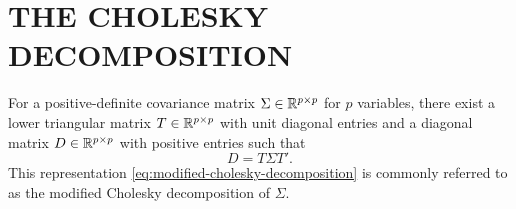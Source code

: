\documentclass[12pt]{article}
\newcommand{\red}[1]{{\color{red}\sout{#1}}}
\begin{document}
\section*{\sffamily \Large THE CHOLESKY DECOMPOSITION}

For a positive-definite covariance matrix $\Sigma \in \Bbb{R}^{p\times p}$ for $p$ variables, there exist a  lower triangular matrix $T \in \Bbb{R}^{p\times p}$ with unit diagonal entries and a diagonal matrix $D \in \Bbb{R}^{p\times p}$ with positive entries such that
\begin{equation}\label{eq:modified-cholesky-decomposition}
D = T\Sigma T'.
\end{equation}
 \noindent
This representation \eqref{eq:modified-cholesky-decomposition} is commonly referred to as the modified Cholesky decomposition of $\Sigma$. 
\end{document}
